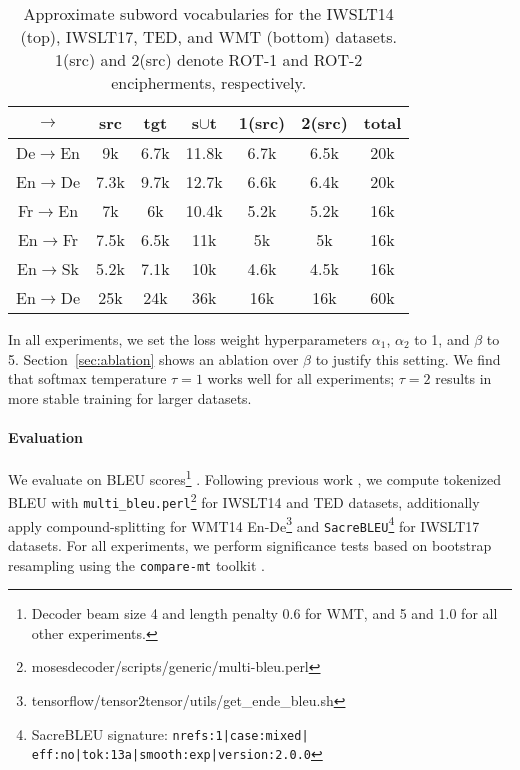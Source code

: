 \documentclass[11pt]{article}
\begin{document}
\begin{table}[ht]
\small
\centering
\scalebox{0.9}
{
\begin{tabular}{ccccccc}
\toprule
\textbf{$\rightarrow$} & \textbf{src}    & \textbf{tgt}    & \textbf{s$\cup$t} & \textbf{1(src)} & \textbf{2(src)} & \textbf{total} \\ \midrule
  De$\rightarrow$En         & 9k & 6.7k & 11.8k      & 6.7k     & 6.5k     & 20k   \\
 En$\rightarrow$De         &   7.3k   & 9.7k     &      12.7k      &  6.6k  &  6.4k   & 20k   \\ \midrule
 Fr$\rightarrow$En         &  7k    &  6k    &    10.4k  &    5.2k      &     5.2k     & 16k   \\
 En$\rightarrow$Fr         &   7.5k   & 6.5k    &  11k      &  5k  &  5k          & 16k   \\ \midrule

 En$\rightarrow$Sk         &  5.2k    & 7.1k     &   10k         &    4.6k      &  4.5k        & 16k   \\\midrule
 En$\rightarrow$De         &   25k   &  24k   & 36k &  16k & 16k  & 60k  
\\ \bottomrule 
\end{tabular}
}
\caption{Approximate subword vocabularies for the IWSLT14 (top), IWSLT17, TED, and WMT (bottom) datasets. 1(src) and 2(src) denote ROT-1 and ROT-2 encipherments, respectively.}
\label{tab:bpevocab}
\end{table}




In all experiments, we set the loss weight hyperparameters $\alpha_1$, $\alpha_2$ to 1, and $\beta$ to 5. Section~\ref{sec:ablation} shows an ablation over $\beta$ to justify this setting. We find that softmax temperature $\tau=1$ works well for all experiments; $\tau = 2$ results in more stable training for larger datasets.
\vspace{-0.5em}
\paragraph{Evaluation} We evaluate on BLEU scores\footnote{Decoder beam size 4 and length penalty 0.6 for WMT, and 5 and 1.0 for all other experiments.} \cite{papineni-etal-2002-bleu}. Following previous work \cite{vaswani2017attention,nguyen19datadiverse, xu2021bert}, we compute tokenized BLEU with \texttt{multi\_bleu.perl}\footnote{mosesdecoder/scripts/generic/multi-bleu.perl} for IWSLT14 and TED datasets, additionally apply compound-splitting for WMT14 En-De\footnote{tensorflow/tensor2tensor/utils/get\_ende\_bleu.sh} and \texttt{SacreBLEU}\footnote{SacreBLEU signature: \texttt{nrefs:1|case:mixed|} \texttt{eff:no|tok:13a|smooth:exp|version:2.0.0}} \cite{post-2018-call} for IWSLT17 datasets. For all experiments, we perform significance tests based on bootstrap resampling \cite{clark2011better} using the \texttt{compare-mt} toolkit \cite{neubig-etal-2019-compare}.
\end{document}
